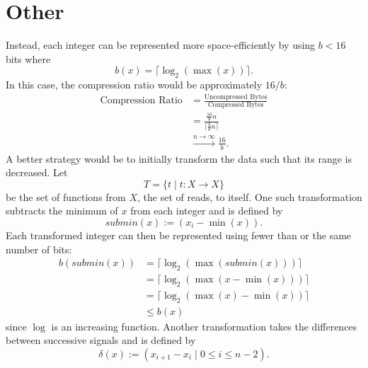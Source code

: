 \section{Other}

Instead, each integer can be represented more space-efficiently by using $b<16$ bits where \[b(x)=\lceil\log_2(\max(x))\rceil.\] In this case, the compression ratio would be approximately $16/b$:
\begin{align*}
	\text{Compression Ratio} &= \frac{\text{Uncompressed Bytes}}{\text{Compressed Bytes}}\\
	&=\frac{\frac{16}{8}n}{\lceil\frac{b}{8}n\rceil}\\
	&\stackrel{n\to\infty}{\longrightarrow}\frac{16}{b}.
\end{align*}
A better strategy would be to initially transform the data such that its range is decreased.
Let \[T=\{t\mid t:X\to X\}\] be the set of functions from $X$, the set of reads, to itself. One such transformation subtracts the minimum of $x$ from each integer and is defined by \[ submin(x) := (x_i-\min(x)). \] Each transformed integer can then be represented using fewer than or the same number of bits:
\begin{align*}
	b(submin(x))&=\lceil\log_2(\max(submin(x)))\rceil\\
	&=\lceil\log_2(\max(x-\min(x)))\rceil\\
	&=\lceil\log_2(\max(x)-\min(x))\rceil\\
	&\le b(x)
\end{align*}
since $\log$ is an increasing function.
Another transformation takes the differences between successive signals and is defined by
\[ \delta(x):=(x_{i+1}-x_i\mid 0\le i\le n-2).\]
